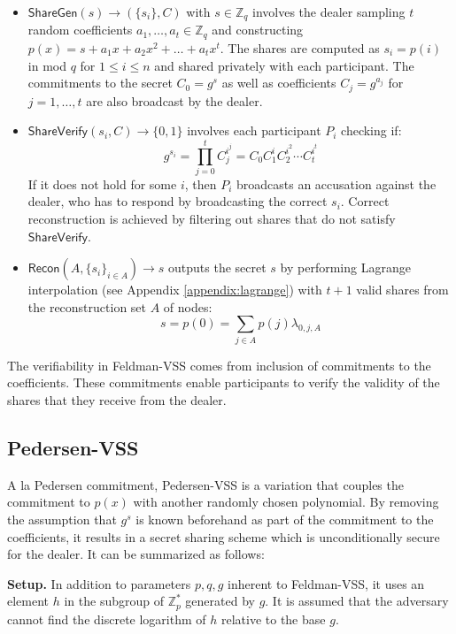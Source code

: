 \documentclass[letterpaper,twocolumn,10pt]{article}
\theoremstyle{definition}
\theoremstyle{remark}
\begin{document}
\begin{itemize}
\item $\mathsf{ShareGen}(s) \rightarrow (\{s_i\}, C)$ with $s \in \mathbb{Z}_q$ involves the dealer sampling $t$ random coefficients $a_1, \ldots, a_t \in \mathbb{Z}_q$ and constructing $p(x) = s + a_1x+ a_2x^2 +\ldots+a_tx^t$. The shares are computed as $s_i = p(i)$ in mod $q$ for $1\le i \le n$ and shared privately with each participant. The commitments to the secret $C_0 = g^s$ as well as coefficients $C_j = g^{a_j}$ for $j = 1,\ldots,t$ are also broadcast by the dealer.
\item $\mathsf{ShareVerify}(s_i, C) \rightarrow \{0, 1\}$ involves each participant $P_i$ checking if:
$$g^{s_i} = \prod_{j = 0}^{t} C_j^{i^j} = C_0 C_1^i C_2^{i^2} \cdots C_{t}^{i^{t}}$$
If it does not hold for some $i$, then $P_i$ broadcasts an accusation against the dealer, who has to respond by broadcasting the correct $s_i$. Correct reconstruction is achieved by filtering out shares that do not satisfy $\mathsf{ShareVerify}$.
\item $\mathsf{Recon}(A, \{s_i\}_{i \in A}) \rightarrow s$ outputs the secret $s$ by performing Lagrange interpolation (see Appendix \ref{appendix:lagrange}) with $t + 1$ valid shares from the reconstruction set $A$ of nodes:
$$s = p(0) = \sum_{j \in A} p(j) \lambda_{0, j, A}$$
\end{itemize}

The verifiability in Feldman-VSS comes from inclusion of commitments to the coefficients. These commitments enable participants to verify the validity of the shares that they receive from the dealer.
\fi

\iffalse
\subsection{Pedersen-VSS}
\label{appendix:pedersenVSS}
A la Pedersen commitment, Pedersen-VSS is a variation that couples the commitment to $p(x)$ with another randomly chosen polynomial. By removing the assumption that $g^s$ is known beforehand as part of the commitment to the coefficients, it results in a secret sharing scheme which is unconditionally secure for the dealer. It can be summarized as follows:

\textbf{Setup.} In addition to parameters $p,q,g$ inherent to Feldman-VSS, it uses an element $h$ in the subgroup of $\mathbb{Z}^*_p$ generated by $g$. It is assumed that the adversary cannot find the discrete logarithm of $h$ relative to the base $g$.
\end{document}
